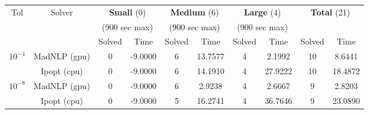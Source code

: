 \begin{tabular}{|c|c|cc|cc|cc|cc|}
  \hline
  \multirow{ 3}{*}{Tol} & \multirow{ 3}{*}{Solver} & \multicolumn{2}{c|}{\textbf{Small} (0)}& \multicolumn{2}{c|}{\textbf{Medium} (6)}& \multicolumn{2}{c|}{\textbf{Large} (4)}& \multicolumn{2}{c|}{\multirow{2}{*}{\textbf{Total} (21)}}\\
                        && \multicolumn{2}{c|}{(900 sec max)}& \multicolumn{2}{c|}{(900 sec max)}& \multicolumn{2}{c|}{(900 sec max)}&&\\
                        &&  Solved & Time &  Solved & Time &  Solved & Time &  Solved & Time \\
  \hline
    \multirow{2}{*}{$10^{-4}$} & MadNLP (gpu) & 0 & -9.0000 & 6 & 13.7577 & 4 & 2.1992 & 10 & 8.6441  \\
                        & Ipopt (cpu) & 0 & -9.0000 & 6 & 14.1910 & 4 & 27.9222 & 10 & 18.4872  \\

  \hline
    \multirow{2}{*}{$10^{-8}$} & MadNLP (gpu) & 0 & -9.0000 & 6 & 2.9238 & 4 & 2.6667 & 9 & 2.8203  \\
                        & Ipopt (cpu) & 0 & -9.0000 & 5 & 16.2741 & 4 & 36.7646 & 9 & 23.0890  \\

  \hline
\end{tabular}

